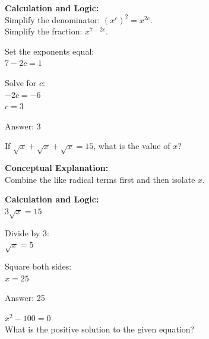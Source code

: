 \documentclass[11pt,paper=a4,answers]{exam}
\begin{document}
\begin{questions}
\begin{solution}
\vspace{20pt}

\textbf{Calculation and Logic:} \\
Simplify the denominator: $(x^c)^2 = x^{2c}$. \\
Simplify the fraction: $x^{7 - 2c}$.

\vspace{10pt}

Set the exponents equal: \\
$7 - 2c = 1$

\vspace{10pt}

Solve for $c$: \\
$-2c = -6$ \\
$c = 3$

\vspace{25pt}

Answer: \colorbox{yellow!100}{3}
\end{solution}

\vspace{40pt}

\question
If $\sqrt{x} + \sqrt{x} + \sqrt{x} = 15$, what is the value of $x$?

\begin{solution}
\textbf{Conceptual Explanation:} \\
Combine the like radical terms first and then isolate $x$.

\vspace{20pt}

\textbf{Calculation and Logic:} \\
$3\sqrt{x} = 15$

\vspace{10pt}

Divide by 3: \\
$\sqrt{x} = 5$

\vspace{10pt}

Square both sides: \\
$x = 25$

\vspace{25pt}

Answer: \colorbox{yellow!100}{25}
\end{solution}

\vspace{40pt}

\question
$x^2 - 100 = 0$ \\
What is the positive solution to the given equation?


\end{questions}
\end{document}
